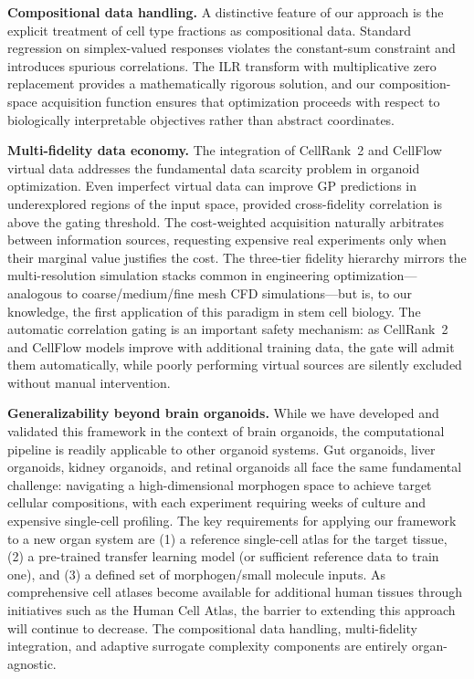 \documentclass[times,twoside]{zHenriquesLab-StyleBioRxiv}
\begin{document}
\textbf{Compositional data handling.} A distinctive feature of our approach is the explicit treatment of cell type fractions as compositional data. Standard regression on simplex-valued responses violates the constant-sum constraint and introduces spurious correlations. The ILR transform with multiplicative zero replacement \cite{MartinFernandez2015, Aitchison1986} provides a mathematically rigorous solution, and our composition-space acquisition function ensures that optimization proceeds with respect to biologically interpretable objectives rather than abstract coordinates.

\textbf{Multi-fidelity data economy.} The integration of CellRank~2 and CellFlow virtual data addresses the fundamental data scarcity problem in organoid optimization. Even imperfect virtual data can improve GP predictions in underexplored regions of the input space, provided cross-fidelity correlation is above the gating threshold. The cost-weighted acquisition naturally arbitrates between information sources, requesting expensive real experiments only when their marginal value justifies the cost. The three-tier fidelity hierarchy mirrors the multi-resolution simulation stacks common in engineering optimization---analogous to coarse/medium/fine mesh CFD simulations---but is, to our knowledge, the first application of this paradigm in stem cell biology. The automatic correlation gating is an important safety mechanism: as CellRank~2 and CellFlow models improve with additional training data, the gate will admit them automatically, while poorly performing virtual sources are silently excluded without manual intervention.

\textbf{Generalizability beyond brain organoids.} While we have developed and validated this framework in the context of brain organoids, the computational pipeline is readily applicable to other organoid systems. Gut organoids, liver organoids, kidney organoids, and retinal organoids all face the same fundamental challenge: navigating a high-dimensional morphogen space to achieve target cellular compositions, with each experiment requiring weeks of culture and expensive single-cell profiling. The key requirements for applying our framework to a new organ system are (1) a reference single-cell atlas for the target tissue, (2) a pre-trained transfer learning model (or sufficient reference data to train one), and (3) a defined set of morphogen/small molecule inputs. As comprehensive cell atlases become available for additional human tissues through initiatives such as the Human Cell Atlas, the barrier to extending this approach will continue to decrease. The compositional data handling, multi-fidelity integration, and adaptive surrogate complexity components are entirely organ-agnostic.
\end{document}
